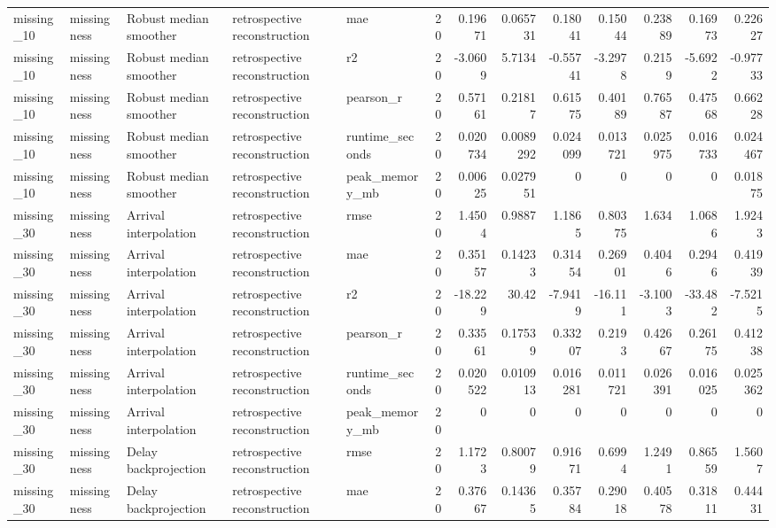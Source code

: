 \begin{table}[!htbp]
{{\begin{tabular}{lllllrrrrrrrr}
missing_10 & missingness & Robust median smoother & retrospective reconstruction & mae & 20 & 0.19671 & 0.065731 & 0.18041 & 0.15044 & 0.23889 & 0.16973 & 0.22627 \\
missing_10 & missingness & Robust median smoother & retrospective reconstruction & r2 & 20 & -3.0609 & 5.7134 & -0.55741 & -3.2978 & 0.2159 & -5.6922 & -0.97733 \\
missing_10 & missingness & Robust median smoother & retrospective reconstruction & pearson_r & 20 & 0.57161 & 0.21817 & 0.61575 & 0.40189 & 0.76587 & 0.47568 & 0.66228 \\
missing_10 & missingness & Robust median smoother & retrospective reconstruction & runtime_seconds & 20 & 0.020734 & 0.0089292 & 0.024099 & 0.013721 & 0.025975 & 0.016733 & 0.024467 \\
missing_10 & missingness & Robust median smoother & retrospective reconstruction & peak_memory_mb & 20 & 0.00625 & 0.027951 & 0 & 0 & 0 & 0 & 0.01875 \\
missing_30 & missingness & Arrival interpolation & retrospective reconstruction & rmse & 20 & 1.4504 & 0.9887 & 1.1865 & 0.80375 & 1.634 & 1.0686 & 1.9243 \\
missing_30 & missingness & Arrival interpolation & retrospective reconstruction & mae & 20 & 0.35157 & 0.14233 & 0.31454 & 0.26901 & 0.4046 & 0.2946 & 0.41939 \\
missing_30 & missingness & Arrival interpolation & retrospective reconstruction & r2 & 20 & -18.229 & 30.42 & -7.9419 & -16.111 & -3.1003 & -33.482 & -7.5215 \\
missing_30 & missingness & Arrival interpolation & retrospective reconstruction & pearson_r & 20 & 0.33561 & 0.17539 & 0.33207 & 0.2193 & 0.42667 & 0.26175 & 0.41238 \\
missing_30 & missingness & Arrival interpolation & retrospective reconstruction & runtime_seconds & 20 & 0.020522 & 0.010913 & 0.016281 & 0.011721 & 0.026391 & 0.016025 & 0.025362 \\
missing_30 & missingness & Arrival interpolation & retrospective reconstruction & peak_memory_mb & 20 & 0 & 0 & 0 & 0 & 0 & 0 & 0 \\
missing_30 & missingness & Delay backprojection & retrospective reconstruction & rmse & 20 & 1.1723 & 0.80079 & 0.91671 & 0.6994 & 1.2491 & 0.86559 & 1.5607 \\
missing_30 & missingness & Delay backprojection & retrospective reconstruction & mae & 20 & 0.37667 & 0.14365 & 0.35784 & 0.29018 & 0.40578 & 0.31811 & 0.44431 \\

\end{tabular}}}
\end{table}
